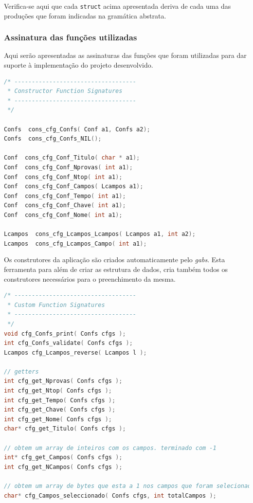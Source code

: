 \documentclass[11pt, a4paper, oneside]{article}
\begin{document}
Verifica-se aqui que cada \texttt{struct} acima apresentada deriva de cada uma das produções que foram indicadas na gramática abstrata.

\newpage
\subsubsection{Assinatura das funções utilizadas}
Aqui serão apresentadas as assinaturas das funções que foram utilizadas para dar suporte à implementação do projeto desenvolvido.

\begin{lstlisting}[language=C, caption={Construtores do ficheiro de configuração.}]
/* -----------------------------------
 * Constructor Function Signatures
 * -----------------------------------
 */

Confs  cons_cfg_Confs( Conf a1, Confs a2);
Confs  cons_cfg_Confs_NIL();

Conf  cons_cfg_Conf_Titulo( char * a1);
Conf  cons_cfg_Conf_Nprovas( int a1);
Conf  cons_cfg_Conf_Ntop( int a1);
Conf  cons_cfg_Conf_Campos( Lcampos a1);
Conf  cons_cfg_Conf_Tempo( int a1);
Conf  cons_cfg_Conf_Chave( int a1);
Conf  cons_cfg_Conf_Nome( int a1);

Lcampos  cons_cfg_Lcampos_Lcampos( Lcampos a1, int a2);
Lcampos  cons_cfg_Lcampos_Campo( int a1);
\end{lstlisting} 

Os construtores da aplicação são criados automaticamente pelo \emph{gabs}. Esta ferramenta para além de criar as estrutura de dados, cria também todos os construtores necessários para o preenchimento da mesma.

\begin{lstlisting}[language=C, caption={Funções do ficheiro de configuração.}]
/* -----------------------------------
 * Custom Function Signatures
 * -----------------------------------
 */
void cfg_Confs_print( Confs cfgs );
int cfg_Confs_validate( Confs cfgs );
Lcampos cfg_Lcampos_reverse( Lcampos l );

// getters
int cfg_get_Nprovas( Confs cfgs );
int cfg_get_Ntop( Confs cfgs );
int cfg_get_Tempo( Confs cfgs );
int cfg_get_Chave( Confs cfgs );
int cfg_get_Nome( Confs cfgs );
char* cfg_get_Titulo( Confs cfgs );

// obtem um array de inteiros com os campos. terminado com -1
int* cfg_get_Campos( Confs cfgs );
int cfg_get_NCampos( Confs cfgs );

// obtem um array de bytes que esta a 1 nos campos que foram selecionados
char* cfg_Campos_seleccionado( Confs cfgs, int totalCampos );
\end{lstlisting} 
\end{document}
